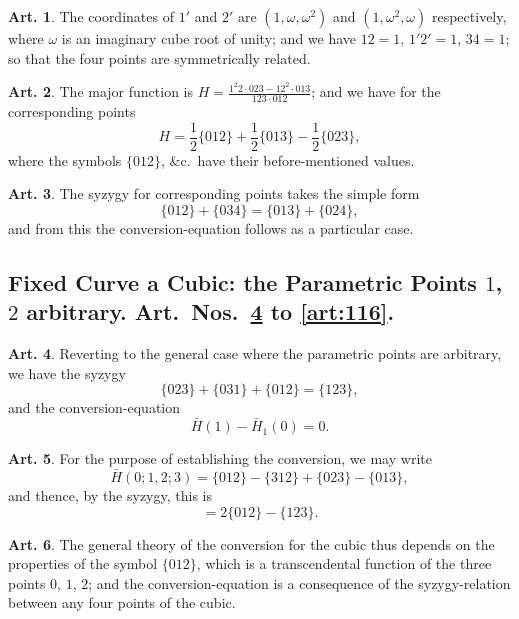 \documentclass[12pt,a4paper]{article}
\theoremstyle{definition}
\newtheorem{art}{Art.}[section]
\begin{document}
\begin{art}\label{art:108}
The coordinates of $1'$ and $2'$ are $(1, \omega, \omega^2)$ and $(1, \omega^2, \omega)$ respectively, where $\omega$ is an imaginary cube root of unity; and we have $12 = 1$, $1'2' = 1$, $34 = 1$; so that the four points are symmetrically related.
\end{art}

\begin{art}\label{art:109}
The major function is $H = \frac{1^2 2 \cdot 023 - 12^2 \cdot 013}{123 \cdot 012}$; and we have for the corresponding points
\[
H = \frac{1}{2}\{012\} + \frac{1}{2}\{013\} - \frac{1}{2}\{023\},
\]
where the symbols $\{012\}$, \&c.\ have their before-mentioned values.
\end{art}

\begin{art}\label{art:110}
The syzygy for corresponding points takes the simple form
\[
\{012\} + \{034\} = \{013\} + \{024\},
\]
and from this the conversion-equation follows as a particular case.
\end{art}

\newpage
\subsection*{Fixed Curve a Cubic: the Parametric Points $1$, $2$ arbitrary. Art.~Nos.~\ref{art:111} to \ref{art:116}.}

\begin{art}\label{art:111}
Reverting to the general case where the parametric points are arbitrary, we have the syzygy
\[
\{023\} + \{031\} + \{012\} = \{123\},
\]
and the conversion-equation
\[
\bar{H}(1) - \bar{H}_1(0) = 0.
\]
\end{art}

\begin{art}\label{art:112}
For the purpose of establishing the conversion, we may write
\[
\bar{H}(0; 1, 2; 3) = \{012\} - \{312\} + \{023\} - \{013\},
\]
and thence, by the syzygy, this is
\[
= 2\{012\} - \{123\}.
\]
\end{art}

\begin{art}\label{art:113}
The general theory of the conversion for the cubic thus depends on the properties of the symbol $\{012\}$, which is a transcendental function of the three points $0$, $1$, $2$; and the conversion-equation is a consequence of the syzygy-relation between any four points of the cubic.
\end{art}
\end{document}
